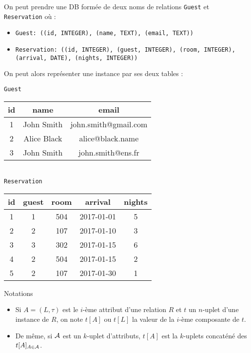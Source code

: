 \documentclass{cours}
\begin{document}
On peut prendre une DB formée de deux noms de relations \texttt{Guest} et \texttt{Reservation} où :
\begin{itemize}
    \item \texttt{Guest: ((id, INTEGER), (name, TEXT), (email, TEXT))}
    \item \texttt{Reservation: ((id, INTEGER), (guest, INTEGER), (room, INTEGER), (arrival, DATE), (nights, INTEGER))}
\end{itemize} 
On peut alors représenter une instance par ses deux tables : 
\begin{center}
    {\tt Guest}\\
    \begin{tabular}{ccc}
        \toprule
        id & name & email\\
        \midrule
        1 & John Smith & john.smith@gmail.com\\
        2 & Alice Black & alice@black.name\\
        3 & John Smith & john.smith@ens.fr\\
        \bottomrule
    \end{tabular}\\
    \vspace{.3cm}
    {\tt Reservation}\\
    \begin{tabular}{ccccc}
        \toprule
        id & guest & room & arrival & nights\\
        \midrule 
        1 & 1 & 504 & 2017-01-01 & 5\\
        2 & 2 & 107 & 2017-01-10 & 3\\
        3 & 3 & 302 & 2017-01-15 & 6\\
        4 & 2 & 504 & 2017-01-15 & 2\\
        5 & 2 & 107 & 2017-01-30 & 1\\
        \bottomrule
    \end{tabular}
\end{center}

\begin{définition}{Notations}{}
    \begin{itemize}
        \item Si $A = \left(L, \tau\right)$ est le $i$-ème attribut d'une relation $R$ et $t$ un $n$-uplet d'une instance de $R$, on note $t[A]$ ou $t[L]$ la valeur de la $i$-ème composante de $t$.
        \item De même, si $\mathcal{A}$ est un $k$-uplet d'attributs, $t[A]$ est la $k$-uplets concaténé des $t[A]_{A\in \mathcal{A}}$.
    \end{itemize}
\end{définition}
\end{document}
